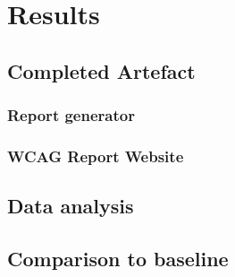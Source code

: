 \chapter{Results}\label{cha:results}


\section{Completed Artefact}


\subsection{Report generator}

\subsection{WCAG Report Website}

\section{Data analysis}

\section{Comparison to baseline}